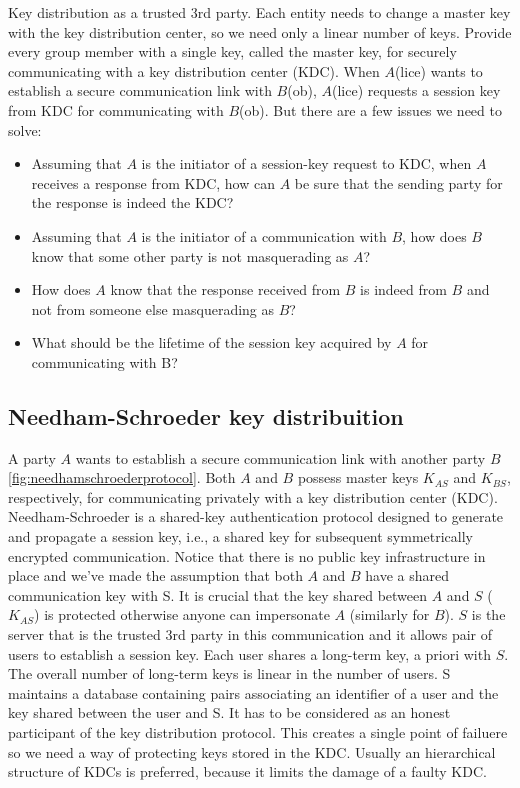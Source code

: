 Key distribution as a trusted 3rd party. Each entity needs to change a master key with the key distribution center, so we need only a linear number of keys. Provide every group member with a single key, called the master key, for securely communicating with a key distribution center (KDC). When $A$(lice) wants to establish a secure communication link with $B$(ob), $A$(lice) requests a session key from KDC for communicating with $B$(ob). But there are a few issues we need to solve:
\begin{itemize}
	\item Assuming that $A$ is the initiator of a session-key request to KDC, when $A$ receives a response from KDC, how can $A$ be sure that the sending party for the response is indeed the KDC?
	\item Assuming that $A$ is the initiator of a communication with $B$, how does $B$ know that some other party is not masquerading as $A$?
	\item How does $A$ know that the response received from $B$ is indeed from $B$ and not from someone else masquerading as $B$?
	\item What should be the lifetime of the session key acquired by $A$ for communicating with B?
\end{itemize}

\subsection{Needham-Schroeder key distribuition}

A party $A$ wants to establish a secure communication link with another party $B$ \ref{fig:needhamschroederprotocol}. Both $A$ and $B$ possess master keys $K_{AS}$ and $K_{BS}$, respectively, for communicating privately with a key distribution center (KDC). Needham-Schroeder is a shared-key authentication protocol designed to generate and propagate a session key, i.e., a shared key for subsequent symmetrically encrypted communication. Notice that there is no public key infrastructure in place and we've made the assumption that both $A$ and $B$ have a shared communication key with S. It is crucial that the key shared between $A$ and $S$ ($K_{AS}$) is protected otherwise anyone can impersonate $A$ (similarly for $B$).
$S$ is the server that is the trusted 3rd party in this communication and it allows pair of users to establish a session key. Each user shares a long-term key, a priori with $S$. The overall number of long-term keys is linear in the number of users. S maintains a database containing pairs associating an identifier of a user and the key shared between the user and S. It has to be considered as an honest participant of the key distribution protocol. This creates a single point of failuere so we need a way of protecting keys stored in the KDC. Usually an hierarchical structure of KDCs is preferred, because it limits the damage of a faulty KDC. 

